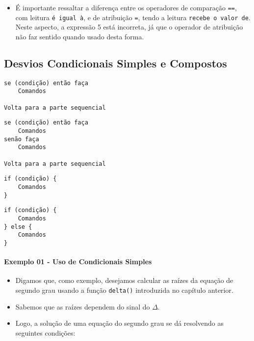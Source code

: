 \documentclass[12pt,a4paper]{article}
\providecommand{\tightlist}{%
      \setlength{\itemsep}{0pt}\setlength{\parskip}{0pt}}
\begin{document}
    \begin{itemize}
\tightlist
\item
  É importante ressaltar a diferença entre os operadores de comparação
  \texttt{==}, com leitura \texttt{é\ igual\ à}, e de atribuição
  \texttt{=}, tendo a leitura \texttt{recebe\ o\ valor\ de}. Neste
  aspecto, a expressão 5 está incorreta, já que o operador de atribuição
  não faz sentido quando usado desta forma.
\end{itemize}

    \hypertarget{desvios-condicionais-simples-e-compostos}{%
\subsection{Desvios Condicionais Simples e
Compostos}\label{desvios-condicionais-simples-e-compostos}}

    \begin{verbatim}
se (condição) então faça 
    Comandos

Volta para a parte sequencial
\end{verbatim}

\begin{verbatim}
se (condição) então faça 
    Comandos
senão faça 
    Comandos

Volta para a parte sequencial
\end{verbatim}

    \begin{verbatim}
if (condição) {
    Comandos
}
\end{verbatim}

\begin{verbatim}
if (condição) {
    Comandos
} else {
    Comandos
}
\end{verbatim}

    \hypertarget{exemplo-01---uso-de-condicionais-simples}{%
\paragraph{Exemplo 01 - Uso de Condicionais
Simples}\label{exemplo-01---uso-de-condicionais-simples}}

    \begin{itemize}
\item
  Digamos que, como exemplo, desejamos calcular as raízes da equação de
  segundo grau usando a função \texttt{delta()} introduzida no capítulo
  anterior.
\item
  Sabemos que as raízes dependem do sinal do \(\Delta\).
\item
  Logo, a solução de uma equação do segundo grau se dá resolvendo as
  seguintes condições:
\end{itemize}
\end{document}

